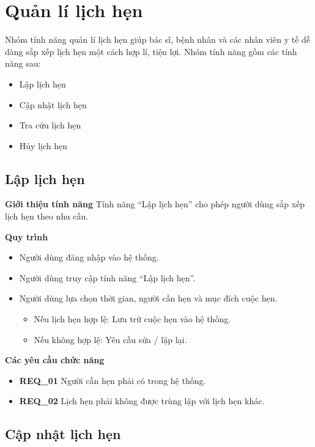 \section{Quản lí lịch hẹn}

Nhóm tính năng quản lí lịch hẹn giúp bác sĩ, bệnh nhân và các nhân viên y tế dễ dàng sắp xếp lịch hẹn một cách hợp lí, tiện lợi. Nhóm tính năng gồm các tính năng sau:
\begin{itemize}
    \item Lập lịch hẹn
    \item Cập nhật lịch hẹn
    \item Tra cứu lịch hẹn
    \item Hủy lịch hẹn
\end{itemize}

\subsection{Lập lịch hẹn}

\noindent \textbf{Giới thiệu tính năng}
Tính năng ``Lập lịch hẹn'' cho phép người dùng sắp xếp lịch hẹn theo nhu cầu.

\noindent \textbf{Quy trình}
\begin{itemize}
    \item Người dùng đăng nhập vào hệ thống.
    \item Người dùng truy cập tính năng ``Lập lịch hẹn''.
    \item Người dùng lựa chọn thời gian, người cần hẹn và mục đích cuộc hẹn.
    \begin{itemize}
        \item Nếu lịch hẹn hợp lệ: Lưu trữ cuộc hẹn vào hệ thống.
        \item Nếu không hợp lệ: Yêu cầu sửa / lập lại.
    \end{itemize}
\end{itemize}

\noindent \textbf{Các yêu cầu chức năng}
\begin{itemize}
    \item \textbf{REQ\_01} Người cần hẹn phải có trong hệ thống.
    \item \textbf{REQ\_02} Lịch hẹn phải không được trùng lặp với lịch hẹn khác.
\end{itemize}

\subsection{Cập nhật lịch hẹn}

